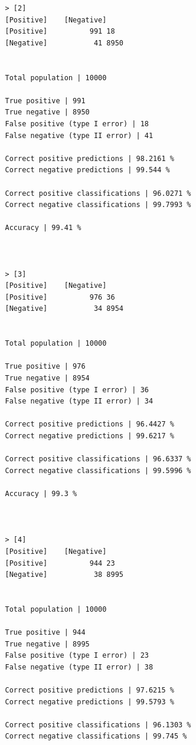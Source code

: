 \documentclass{classrep}
\begin{document}
{{{\begin{lstlisting}
                > [2]
                [Positive]    [Negative]
                [Positive]          991 18
                [Negative]           41 8950


                Total population | 10000

                True positive | 991
                True negative | 8950
                False positive (type I error) | 18
                False negative (type II error) | 41

                Correct positive predictions | 98.2161 %
                Correct negative predictions | 99.544 %

                Correct positive classifications | 96.0271 %
                Correct negative classifications | 99.7993 %

                Accuracy | 99.41 %



                > [3]
                [Positive]    [Negative]
                [Positive]          976 36
                [Negative]           34 8954


                Total population | 10000

                True positive | 976
                True negative | 8954
                False positive (type I error) | 36
                False negative (type II error) | 34

                Correct positive predictions | 96.4427 %
                Correct negative predictions | 99.6217 %

                Correct positive classifications | 96.6337 %
                Correct negative classifications | 99.5996 %

                Accuracy | 99.3 %



                > [4]
                [Positive]    [Negative]
                [Positive]          944 23
                [Negative]           38 8995


                Total population | 10000

                True positive | 944
                True negative | 8995
                False positive (type I error) | 23
                False negative (type II error) | 38

                Correct positive predictions | 97.6215 %
                Correct negative predictions | 99.5793 %

                Correct positive classifications | 96.1303 %
                Correct negative classifications | 99.745 %


\end{lstlisting}}}}
\end{document}
